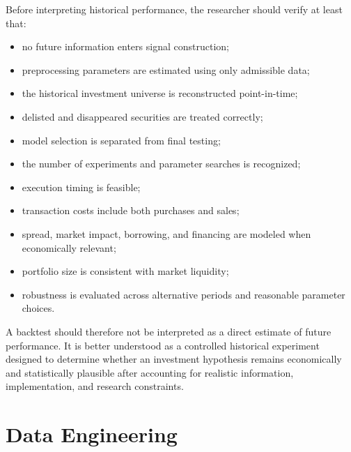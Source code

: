 \documentclass[11pt,a4paper]{article}
\begin{document}
Before interpreting historical performance, the researcher should verify at
least that:

\begin{itemize}
    \item no future information enters signal construction;

    \item preprocessing parameters are estimated using only admissible data;

    \item the historical investment universe is reconstructed point-in-time;

    \item delisted and disappeared securities are treated correctly;

    \item model selection is separated from final testing;

    \item the number of experiments and parameter searches is recognized;

    \item execution timing is feasible;

    \item transaction costs include both purchases and sales;

    \item spread, market impact, borrowing, and financing are modeled when
    economically relevant;

    \item portfolio size is consistent with market liquidity;

    \item robustness is evaluated across alternative periods and reasonable
    parameter choices.
\end{itemize}

A backtest should therefore not be interpreted as a direct estimate of future
performance. It is better understood as a controlled historical experiment
designed to determine whether an investment hypothesis remains economically and
statistically plausible after accounting for realistic information,
implementation, and research constraints.

\part{Data Engineering}
\end{document}
